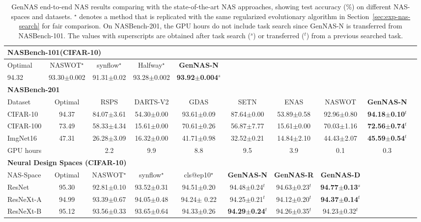 \documentclass{article}
\begin{document}
\begin{table}[]
\vspace{-5pt}
\scriptsize
  \caption{GenNAS end-to-end NAS results comparing with the state-of-the-art NAS approaches, showing test accuracy (\%) on different NAS-spaces and datasets. $^\star$ denotes a method that is replicated with the same regularized evolutionary algorithm in Section~\ref{sec:exp-nas-search} for fair comparison. On NASBench-201, the GPU hours do not include task search since GenNAS-N is transferred from NASBench-101. The values with superscripts are obtained after task search  ($^s$) or transferred ($^t$) from a previous searched task.
  }
  \label{table:GenNAS_NAS_end_to_end}
  \centering
  \scriptsize
\setlength{\tabcolsep}{3pt}
\begin{tabular}{lccccccccc}

\toprule
\multicolumn{6}{l}{\textbf{NASBench-101(CIFAR-10)}} \\ \midrule
Optimal & NASWOT$^\star$ & synflow$^\star$ & Halfway$^\star$ & \textbf{GenNAS-N} \\\midrule
94.32 & 93.30$\pm$0.002 & 91.31$\pm$0.02 & 93.28$\pm$0.002 & \textbf{93.92$\pm$0.004}$^s$ \\

\toprule
\multicolumn{6}{l}{\textbf{NASBench-201}} \\ \midrule
Dataset & Optimal & RSPS & DARTS-V2 & GDAS & SETN & ENAS & NASWOT & \textbf{GenNAS-N} \\\midrule
CIFAR-10 & 94.37 & 84.07$\pm$3.61  & 54.30$\pm$0.00 & 93.61$\pm$0.09 & 87.64$\pm$0.00 & 53.89$\pm$0.58 & 92.96$\pm$0.80 & \textbf{94.18$\pm$0.10}$^t$ \\

CIFAR-100 & 73.49 & 58.33$\pm$4.34 & 15.61$\pm$0.00  & 70.61$\pm$0.26 & 56.87$\pm$7.77 & 15.61$\pm$0.00 & 70.03$\pm$1.16 & \textbf{72.56$\pm$0.74}$^t$ \\

ImgNet16 & 47.31 & 26.28$\pm$3.09  & 16.32$\pm$0.00 & 41.71$\pm$0.98 & 32.52$\pm$0.21 & 14.84$\pm$2.10 & 44.43$\pm$2.07 & \textbf{45.59$\pm$0.54}$^t$ \\
\midrule
\multicolumn{2}{l}{GPU hours} & 2.2  & 9.9 & 8.8 & 9.5 & 3.9 & 0.1 & 0.3 \\

\toprule
\multicolumn{6}{l}{\textbf{Neural Design Spaces (CIFAR-10)}} \\ \midrule
NAS-Space & Optimal & NASWOT$^\star$ & synflow$^\star$ & cls@ep10$^\star$ & \textbf{GenNAS-N} & \textbf{GenNAS-R} & \textbf{GenNAS-D} \\\midrule
ResNet & 95.30 & 92.81$\pm$0.10 & 93.52$\pm$0.31  & 94.51$\pm$0.20 & 94.48$\pm$0.24$^t$& 94.63$\pm$0.23$^t$ &\textbf{94.77$\pm$0.13}$^s$ \\
ResNeXt-A &94.99 & 93.39$\pm$0.67 & 94.05$\pm$0.48 & 94.24$\pm$ 0.22& 94.25$\pm$0.21$^t$ &94.12$\pm$0.20$^t$ &\textbf{94.37$\pm$0.14}$^t$\\
ResNeXt-B & 95.12 & 93.56$\pm$0.33 & 93.65$\pm$0.64 & 94.33$\pm$0.26 &\textbf{94.29$\pm$0.24}$^t$& 94.26$\pm$0.35$^t$ &94.23$\pm$0.32$^t$\\


\end{tabular}
\end{table}
\end{document}
